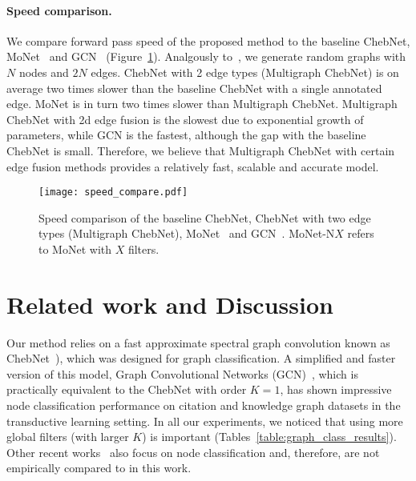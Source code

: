 \documentclass[final,nonatbib]{article} \usepackage{nips_2018}
\begin{document}
	\paragraph{Speed comparison.}
	We compare forward pass speed of the proposed method to the baseline ChebNet, MoNet~\cite{monti2017geometric} and GCN~\cite{kipf2016semi} (Figure~\ref{fig:speed}). Analgously to~\cite{kipf2016semi}, we generate random graphs with $N$ nodes and $2N$ edges. ChebNet with 2 edge types (Multigraph ChebNet) is on average two times slower than the baseline ChebNet with a single annotated edge. MoNet is in turn two times slower than Multigraph ChebNet. Multigraph ChebNet with 2d edge fusion is the slowest due to exponential growth of parameters, while GCN is the fastest, although the gap with the baseline ChebNet is small. Therefore, we believe that Multigraph ChebNet with certain edge fusion methods provides a relatively fast, scalable and accurate model.

	\begin{figure}[]
		\begin{center}
			\texttt{[image: speed\_compare.pdf]}
		\end{center}
		\caption{Speed comparison of the baseline ChebNet, ChebNet with two edge types (Multigraph ChebNet), MoNet~\cite{monti2017geometric} and GCN~\cite{kipf2016semi}. MoNet-N$X$ refers to MoNet with $X$ filters.
		}
		\label{fig:speed}
	\end{figure}

	\section{Related work and Discussion}
	\label{sec:works}

	Our method relies on a fast approximate spectral graph convolution known as ChebNet~\cite{defferrard2016convolutional}), which was designed for graph classification. A simplified and faster version of this model, Graph Convolutional Networks (GCN)~\cite{kipf2016semi}, which is practically equivalent to the ChebNet with order $K=1$, has shown impressive node classification performance on citation and knowledge graph datasets in the transductive learning setting. In all our experiments, we noticed that using more global filters (with larger $K$) is important (Tables~\ref{table:graph_class_results}).
	Other recent works~\cite{hamilton2017inductive, velickovic2017graph} also focus on node classification and, therefore, are not empirically compared to in this work.
\end{document}
